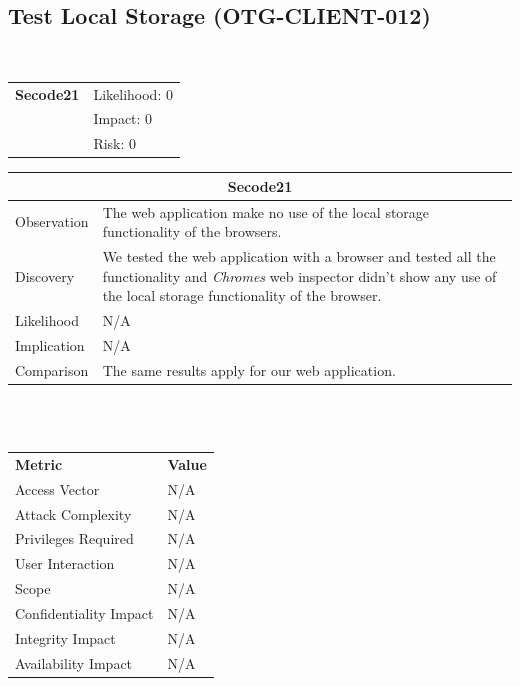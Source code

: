\documentclass[headsepline,footsepline,footinclude=false,oneside,fontsize=11pt,paper=a4,listof=totoc,bibliography=totoc]{scrbook} %
\begin{document}
\subsection{Test Local Storage (OTG-CLIENT-012)}\
\begin{tabular}{cR{12cm}}
	\textbf{Secode21} & Likelihood: 0\\& Impact: 0\\& Risk: 0
\end{tabular}

\begin{tabular}{ l|p{11cm}  }
	\hline
	\multicolumn{2}{c}{\textbf{Secode21}} \\
	\hline
	Observation   & The web application make no use of the local storage functionality of the browsers. \\
	Discovery  & We tested the web application with a browser and tested all the functionality and \textit{Chromes} web inspector didn't show any use of the local storage functionality of the browser. \\
	Likelihood & N/A \\
	Implication    & N/A \\
	Comparison & The same results apply for our web application.  \\
	\hline
\end{tabular}
\\
\vspace{0.5cm}
\\
\begin{center}
	\begin{tabular}{ll}
		\rowcolor[HTML]{34CDF9}
		{\color[HTML]{ECF4FF} \textbf{Metric}}        & {\color[HTML]{ECF4FF} \textbf{Value}} \\
		\rowcolor[HTML]{BBDAFF}
		{\color[HTML]{333333} Access Vector}          & {\color[HTML]{333333} } N/A              \\
		\rowcolor[HTML]{ECF4FF}
		{\color[HTML]{333333} Attack Complexity}      & {\color[HTML]{333333} } N/A              \\
		\rowcolor[HTML]{BBDAFF}
		{\color[HTML]{333333} Privileges Required}    & {\color[HTML]{333333} } N/A              \\
		\rowcolor[HTML]{ECF4FF}
		{\color[HTML]{333333} User Interaction}       & {\color[HTML]{333333} } N/A              \\
		\rowcolor[HTML]{BBDAFF}
		{\color[HTML]{333333} Scope}                  & {\color[HTML]{333333} } N/A              \\
		\rowcolor[HTML]{ECF4FF}
		{\color[HTML]{333333} Confidentiality Impact} & {\color[HTML]{333333} } N/A              \\
		\rowcolor[HTML]{BBDAFF}
		{\color[HTML]{333333} Integrity Impact}       & {\color[HTML]{333333} } N/A              \\
		\rowcolor[HTML]{ECF4FF}
		{\color[HTML]{333333} Availability Impact}    & {\color[HTML]{333333} } N/A
	\end{tabular}
\end{center}
\pagebreak


\appendix{}

\glsaddall{} %
\printglossaries{}

\printbibliography{}
\end{document}
